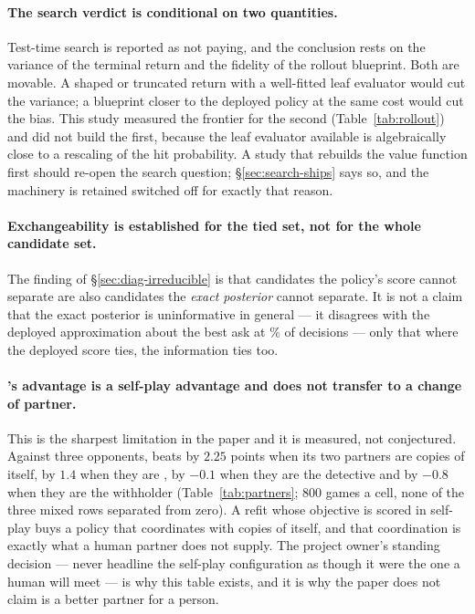 \paragraph{The search verdict is conditional on two quantities.}
Test-time search is reported as not paying, and the conclusion rests on the variance of the terminal
return and the fidelity of the rollout blueprint. Both are movable. A shaped or truncated return
with a well-fitted leaf evaluator would cut the variance; a blueprint closer to the deployed policy
at the same cost would cut the bias. This study measured the frontier for the second
(Table~\ref{tab:rollout}) and did not build the first, because the leaf evaluator available is
algebraically close to a rescaling of the hit probability. A study that rebuilds the value function
first should re-open the search question; \S\ref{sec:search-ships} says so, and the machinery is
retained switched off for exactly that reason.

\paragraph{Exchangeability is established for the tied set, not for the whole candidate set.}
The finding of \S\ref{sec:diag-irreducible} is that candidates the policy's score cannot separate
are also candidates the \emph{exact posterior} cannot separate. It is not a claim that the exact
posterior is uninformative in general --- it disagrees with the deployed approximation about the
best ask at \vsixDisagreeFive\% of decisions --- only that where the deployed score ties, the
information ties too.

\paragraph{\vsix{}'s advantage is a self-play advantage and does not transfer to a change of
partner.} This is the sharpest limitation in the paper and it is measured, not conjectured. Against
three \vfive{} opponents, \vsix{} beats \vfive{} by $2.25$ points when its two partners are copies
of itself, by $1.4$ when they are \vthree{}, by $-0.1$ when they are the detective and by $-0.8$
when they are the withholder (Table~\ref{tab:partners}; 800 games a cell, none of the three mixed
rows separated from zero). A refit whose objective is scored in self-play buys a policy that
coordinates with copies of itself, and that coordination is exactly what a human partner does not
supply. The project owner's standing decision --- never headline the self-play configuration as
though it were the one a human will meet --- is why this table exists, and it is why the paper does
not claim \vsix{} is a better partner for a person.

